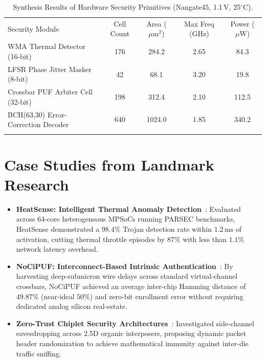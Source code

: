 \begin{table}[t]
\centering
\caption{Synthesis Results of Hardware Security Primitives (Nangate45, 1.1\,V, 25$^\circ$C).}
\label{tab:security-synthesis}
\begin{tabular}{lcccc}
\hline\noalign{\smallskip}
Security Module & Cell Count & Area ($\mu\mathrm{m}^2$) & Max Freq (GHz) & Power ($\mu\mathrm{W}$) \\
\noalign{\smallskip}\svhline\noalign{\smallskip}
WMA Thermal Detector (16-bit) & 176 & 284.2 & 2.65 & 84.3 \\
LFSR Phase Jitter Masker (8-bit) & 42 & 68.1 & 3.20 & 19.8 \\
Crossbar PUF Arbiter Cell (32-bit) & 198 & 312.4 & 2.10 & 112.5 \\
BCH(63,30) Error-Correction Decoder & 640 & 1024.0 & 1.85 & 340.2 \\
\noalign{\smallskip}\hline
\end{tabular}
\end{table}

\section{Case Studies from Landmark Research}
\label{sec:security-case-studies}

\begin{itemize}
    \item \textbf{HeatSense: Intelligent Thermal Anomaly Detection}~\cite{Hasanzadeh2026Heat}: Evaluated across 64-core heterogeneous MPSoCs running PARSEC benchmarks, HeatSense demonstrated a $98.4\%$ Trojan detection rate within $1.2\,\mathrm{ms}$ of activation, cutting thermal throttle episodes by $87\%$ with less than $1.1\%$ network latency overhead.
    \item \textbf{NoCiPUF: Interconnect-Based Intrinsic Authentication}~\cite{Grover2025PUF}: By harvesting deep-submicron wire delays across standard virtual-channel crossbars, NoCiPUF achieved an average inter-chip Hamming distance of $49.87\%$ (near-ideal $50\%$) and zero-bit enrollment error without requiring dedicated analog silicon real-estate.
    \item \textbf{Zero-Trust Chiplet Security Architectures}~\cite{Jaster2025Trust}: Investigated side-channel eavesdropping across 2.5D organic interposers, proposing dynamic packet header randomization to achieve mathematical immunity against inter-die traffic sniffing.
\end{itemize}

